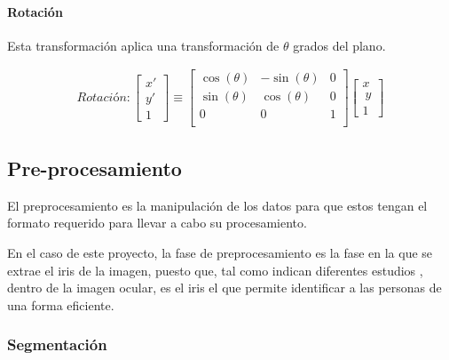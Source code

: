 \paragraph{Rotación}

Esta transformación aplica una transformación de $\theta$ grados del plano.



\begin{gather}
	Rotación:
	\begin{bmatrix} x' \\ y' \\ 1 \end{bmatrix}
	\equiv
	 \begin{bmatrix}
	  \cos(\theta) &-\sin(\theta) & 0 \\
	  \sin(\theta) & \cos(\theta) & 0 \\
	  0 & 0 & 1 \\
	  \end{bmatrix}
	  \begin{bmatrix} x \\\ y \\ 1 \end{bmatrix}
\end{gather}


\subsection{Pre-procesamiento} \label{preprocesamiento}

El preprocesamiento es la manipulación de los datos para que estos tengan el formato requerido para llevar a cabo su procesamiento.

En el caso de este proyecto, la fase de preprocesamiento es la fase en la que se extrae el iris de la imagen, puesto que, tal como indican diferentes estudios \cite{tfg_iris_2020} \cite{abdullah_iris_2015} \cite{malgheet_iris_2021} \cite{boyd_post-mortem_2020} \cite{liu_efficient_2021} \cite{szymkowski_iris-based_2021} \cite{lozej_end--end_2018}, dentro de la imagen ocular, es el iris el que  
permite identificar a las personas de una forma eficiente.

\subsubsection{Segmentación} \label{subsubsec:segmentacion}

